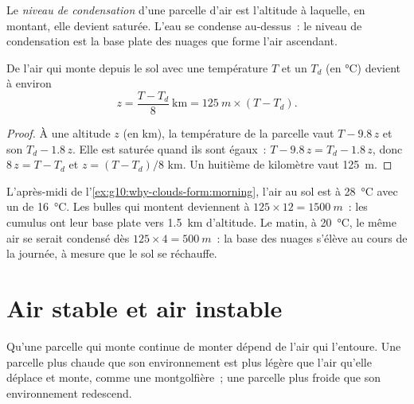 \begin{definition}\label{def:g10:why-clouds-form:condensation-level}
Le \emph{niveau de condensation} d'une
parcelle d'air est l'altitude à laquelle, en montant, elle devient saturée.
L'eau se condense au-dessus~: le niveau de condensation est la base plate
des nuages que forme l'air ascendant.
\end{definition}

\begin{proposition}\label{prop:g10:why-clouds-form:lcl}
De l'air qui monte depuis le sol avec une température $T$ et un  $T_d$ (en \unit{\degreeCelsius}) devient  à environ
\[
  z = \frac{T - T_d}{8}\ \text{km} = \qty{125}{m} \times (T - T_d).
\]
\end{proposition}

\begin{proof}
À une altitude $z$ (en km), la température de la parcelle vaut
$T - 9.8\,z$ et son  $T_d - 1.8\,z$. Elle est saturée quand
ils sont égaux~: $T - 9.8\,z = T_d - 1.8\,z$, donc $8\,z = T - T_d$ et
$z = (T - T_d)/8$ km. Un huitième de kilomètre vaut \qty{125}{m}.
\end{proof}

\begin{example}\label{ex:g10:why-clouds-form:base}
L'après-midi de l'\cref{ex:g10:why-clouds-form:morning}, l'air au sol est à
\qty{28}{\degreeCelsius} avec un  de
\qty{16}{\degreeCelsius}. Les bulles qui montent deviennent  à
$125 \times 12 = \qty{1500}{m}$~: les cumulus ont leur base plate vers
\qty{1.5}{km} d'altitude. Le matin, à \qty{20}{\degreeCelsius}, le même air
se serait condensé dès $125 \times 4 = \qty{500}{m}$~: la base des nuages
s'élève au cours de la journée, à mesure que le sol se réchauffe.
\end{example}

\section{Air stable et air instable}

Qu'une parcelle qui monte continue de monter dépend de l'air qui l'entoure.
Une parcelle plus chaude que son environnement est plus légère que l'air
qu'elle déplace et monte, comme une montgolfière~; une parcelle plus froide
que son environnement redescend.

